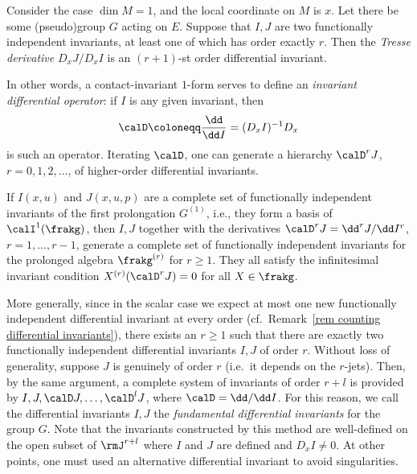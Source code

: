 \begin{thm}
    Consider the case $\dim M=1$, and the local coordinate on $M$ is $x$. Let there be some (pseudo)group $G$ acting on $E$. Suppose that $I,J$ are two functionally independent invariants, at least one of which has order exactly $r$. Then the \emph{Tresse derivative} $D_x J/D_x I$   is an $(r+1)$-st order differential invariant.
\end{thm}

In other words, a contact-invariant $1$-form serves to define an \emph{invariant differential operator}: if $I$ is any given invariant, then 
\[\calD\coloneqq \frac{\dd}{\dd I}= (D_x I)^{-1}D_x\] 
is such an operator. Iterating $\calD$, one can generate a hierarchy $\calD^r J$, $r=0,1,2,\ldots$, of higher-order differential invariants.

If $I(x,u)$ and $J(x,u,p)$ are a complete set of functionally independent invariants of the first prolongation $G^{(1)}$, i.e., they form a basis of $\calI^1(\frakg)$, then $I,J$ together with the derivatives $\calD^r J=\dd ^rJ/\dd I^r$, $r=1,\ldots,r-1$, generate a complete set of functionally independent invariants for the prolonged algebra $\frakg^{(r)}$ for $r\geq 1$. They all satisfy the infinitesimal invariant condition $X^{(r)}(\calD^r J)=0$ for all $X\in\frakg$.

More generally, since in the scalar case we expect at most one new functionally independent differential invariant at every order (cf.\ Remark~\ref{rem counting differential invariants}), there exists an $r\geq 1$ such that there are exactly two functionally independent differential invariants $I,J$ of order $r$. Without loss of generality, suppose $J$ is genuinely of order $r$ (i.e.\ it depends on the $r$-jets). Then, by the same argument, a complete system of invariants of order $r+l$ is provided by $I,J,\calD J,\ldots,\calD^l J$, where $\calD=\dd/\dd I$. For this reason, we call the differential invariants $I,J$ the \emph{fundamental differential invariants} for the group $G$. Note that the invariants constructed by this method are well-defined on the open subset of $\rmJ^{r+l}$ where $I$ and $J$ are defined and $D_x I\neq 0$. At other points, one must used an alternative differential invariant to avoid singularities.

